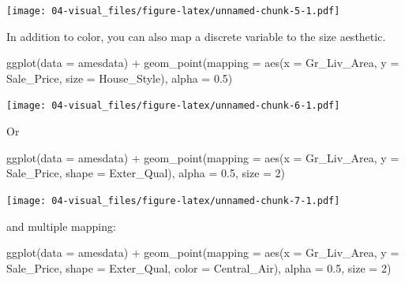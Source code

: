 \documentclass[
]{book}
\newenvironment{Shaded}{\begin{snugshade}}{\end{snugshade}}
\newcommand{\AttributeTok}[1]{\textcolor[rgb]{0.77,0.63,0.00}{#1}}
\newcommand{\DecValTok}[1]{\textcolor[rgb]{0.00,0.00,0.81}{#1}}
\newcommand{\FloatTok}[1]{\textcolor[rgb]{0.00,0.00,0.81}{#1}}
\newcommand{\FunctionTok}[1]{\textcolor[rgb]{0.00,0.00,0.00}{#1}}
\newcommand{\NormalTok}[1]{#1}
\newcommand{\SpecialCharTok}[1]{\textcolor[rgb]{0.00,0.00,0.00}{#1}}
\theoremstyle{definition}
\theoremstyle{definition}
\theoremstyle{definition}
\theoremstyle{definition}
\theoremstyle{remark}
\begin{document}
\texttt{[image: 04-visual\_files/figure-latex/unnamed-chunk-5-1.pdf]}

In addition to color, you can also map a discrete variable to the size aesthetic.

\begin{Shaded}
\begin{Highlighting}[]
\FunctionTok{ggplot}\NormalTok{(}\AttributeTok{data =}\NormalTok{ amesdata) }\SpecialCharTok{+} 
  \FunctionTok{geom\_point}\NormalTok{(}\AttributeTok{mapping =} \FunctionTok{aes}\NormalTok{(}\AttributeTok{x =}\NormalTok{ Gr\_Liv\_Area, }
                           \AttributeTok{y =}\NormalTok{ Sale\_Price, }
                           \AttributeTok{size =}\NormalTok{ House\_Style), }
             \AttributeTok{alpha =} \FloatTok{0.5}\NormalTok{)}
\end{Highlighting}
\end{Shaded}

\texttt{[image: 04-visual\_files/figure-latex/unnamed-chunk-6-1.pdf]}

Or

\begin{Shaded}
\begin{Highlighting}[]
\FunctionTok{ggplot}\NormalTok{(}\AttributeTok{data =}\NormalTok{ amesdata) }\SpecialCharTok{+} 
  \FunctionTok{geom\_point}\NormalTok{(}\AttributeTok{mapping =} \FunctionTok{aes}\NormalTok{(}\AttributeTok{x =}\NormalTok{ Gr\_Liv\_Area, }
                           \AttributeTok{y =}\NormalTok{ Sale\_Price, }
                           \AttributeTok{shape =}\NormalTok{ Exter\_Qual), }
             \AttributeTok{alpha =} \FloatTok{0.5}\NormalTok{,}
             \AttributeTok{size =} \DecValTok{2}\NormalTok{)}
\end{Highlighting}
\end{Shaded}

\texttt{[image: 04-visual\_files/figure-latex/unnamed-chunk-7-1.pdf]}

and multiple mapping:

\begin{Shaded}
\begin{Highlighting}[]
\FunctionTok{ggplot}\NormalTok{(}\AttributeTok{data =}\NormalTok{ amesdata) }\SpecialCharTok{+} 
  \FunctionTok{geom\_point}\NormalTok{(}\AttributeTok{mapping =} \FunctionTok{aes}\NormalTok{(}\AttributeTok{x =}\NormalTok{ Gr\_Liv\_Area, }
                           \AttributeTok{y =}\NormalTok{ Sale\_Price, }
                           \AttributeTok{shape =}\NormalTok{ Exter\_Qual,}
                           \AttributeTok{color =}\NormalTok{ Central\_Air), }
             \AttributeTok{alpha =} \FloatTok{0.5}\NormalTok{,}
             \AttributeTok{size =} \DecValTok{2}\NormalTok{)}
\end{Highlighting}
\end{Shaded}
\end{document}
